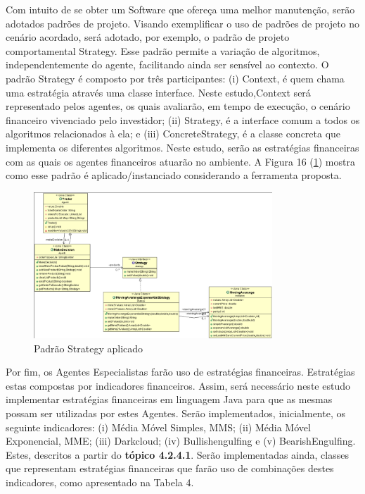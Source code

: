 Com intuito de se obter um Software que ofereça uma melhor manutenção, serão adotados padrões de projeto. Visando exemplificar o uso de padrões de projeto no cenário acordado, será adotado, por exemplo, o padrão de projeto comportamental Strategy. Esse padrão permite a variação de algoritmos, independentemente do agente, facilitando ainda ser sensível ao contexto. O padrão Strategy é composto por três participantes: (i) Context, é quem chama uma estratégia através uma classe interface. Neste estudo,Context será representado pelos agentes, os quais avaliarão, em tempo de execução, o cenário financeiro vivenciado pelo investidor; (ii) Strategy, é a interface comum a todos os algoritmos relacionados à ela; e (iii) ConcreteStrategy, é a classe concreta que implementa os diferentes algoritmos. Neste estudo, serão as estratégias financeiras com as quais os agentes financeiros atuarão no ambiente. A Figura 16 (\ref{f16}) mostra como esse padrão é aplicado/instanciado considerando a ferramenta proposta.

\begin{figure}[h]
\centering
\label{f16}
\includegraphics[width=0.8\textwidth]{figuras/f16}
\caption{Padrão Strategy aplicado}
\end{figure}


Por fim, os Agentes Especialistas farão uso de estratégias financeiras. Estratégias estas compostas por indicadores financeiros. Assim, será necessário neste estudo implementar estratégias financeiras em linguagem Java para que as mesmas possam ser utilizadas por estes Agentes.  Serão implementados, inicialmente, os seguinte indicadores: (i) Média Móvel Simples, MMS; (ii) Média Móvel Exponencial, MME; (iii) Darkcloud; (iv) Bullishengulfing  e (v) BearishEngulfing. Estes, descritos a partir do \textbf{tópico 4.2.4.1}. Serão implementadas ainda, classes que representam estratégias financeiras que farão uso de combinações destes indicadores, como apresentado na Tabela 4.


